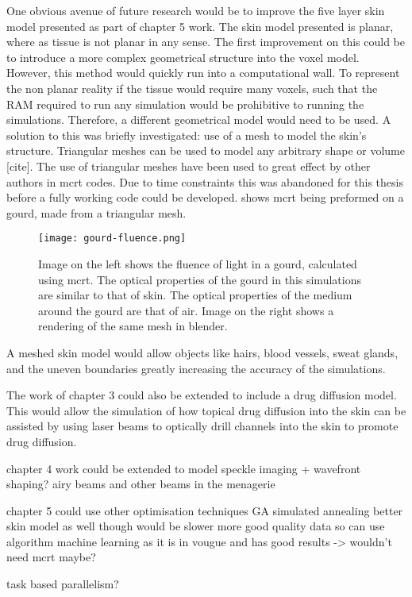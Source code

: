 One obvious avenue of future research would be to improve the five layer skin model presented as part of chapter 5 work.
The skin model presented is planar, where as tissue is not planar in any sense.
The first improvement on this could be to introduce a more complex geometrical structure into the voxel model.
However, this method would quickly run into a computational wall.
To represent the non planar reality if the tissue would require many voxels, such that the RAM required to run any simulation would be prohibitive to running the simulations.
Therefore, a different geometrical model would need to be used.
A solution to this was briefly investigated: use of a mesh to model the skin's structure.
Triangular meshes can be used to model any arbitrary shape or volume [cite].
The use of triangular meshes have been used to great effect by other authors in \gls*{mcrt} codes.
Due to time constraints this was abandoned for this thesis before a fully working code could be developed.
 shows \gls*{mcrt} being preformed on a gourd, made from a triangular mesh.

\begin{figure}[!htpb]
    \centering
    \texttt{[image: gourd-fluence.png]}
    \caption{Image on the left shows the fluence of light in a gourd, calculated using \gls*{mcrt}. The optical properties of the gourd in this simulations are similar to that of skin. The optical properties of the medium around the gourd are that of air. Image on the right shows a rendering of the same mesh in blender.}
    \label{fig:mesh}
\end{figure}

A meshed skin model would allow objects like hairs, blood vessels, sweat glands, and the uneven boundaries greatly increasing the accuracy of the simulations.


The work of chapter 3 could also be extended to include a drug diffusion model.
This would allow the simulation of how topical drug diffusion into the skin can be assisted by using laser beams to optically drill channels into the skin to promote drug diffusion.

chapter 4 work could be extended to model speckle imaging + wavefront shaping?
airy beams and other beams in the menagerie


chapter 5 could use other optimisation techniques GA simulated annealing
better skin model as well though would be slower
more good quality data so can use algorithm
machine learning as it is in vougue and has good results -> wouldn't need mcrt maybe?

task based parallelism?